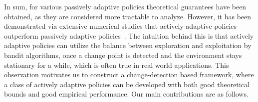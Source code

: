 \documentclass[letterpaper]{article} %
\begin{document}
In sum, for various passively adaptive policies theoretical guarantees have been obtained, as they are considered more tractable to analyze. However, it has been demonstrated via extensive numerical studies that actively adaptive policies outperform passively adaptive policies~\cite{mellor2013thompson}. The intuition behind this is that actively adaptive policies can utilize the balance between exploration and exploitation by bandit algorithms, once a change point is detected and the environment stays stationary for a while, which is often true in real world applications. This observation motivates us to construct a change-detection based framework, where a class of actively adaptive policies can be developed with both good theoretical bounds and good empirical performance. Our main contributions are as follows.
\end{document}
